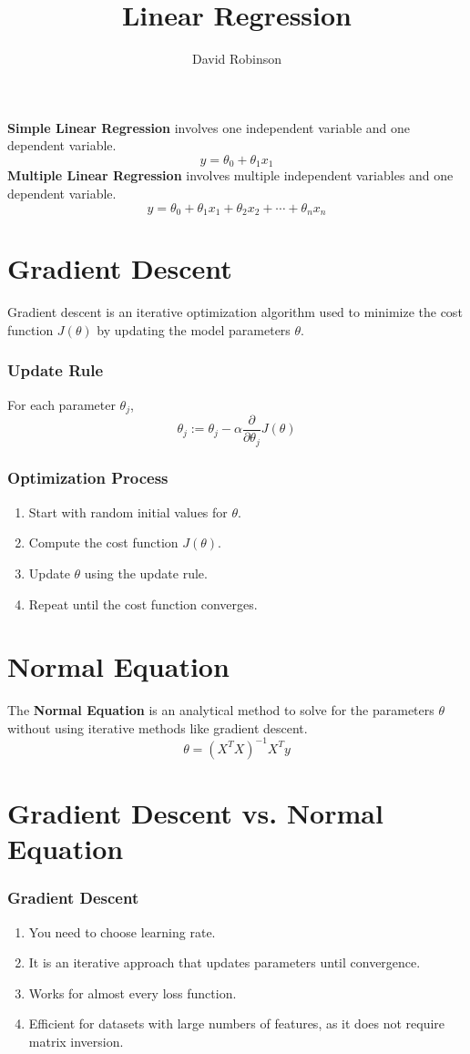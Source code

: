 \documentclass{article}
\title{Linear Regression}
\author{David Robinson}
\date{}
\begin{document}
\maketitle

\textbf{Simple Linear Regression} involves one independent variable and one dependent variable.
\[y=\theta_0 + \theta_1x_1\]
\textbf{Multiple Linear Regression} involves multiple independent variables and one dependent variable.
\[y=\theta_0+\theta_1x_1+\theta_2x_2+\cdots +\theta_n x_n\]

\section*{Gradient Descent}
Gradient descent is an iterative optimization algorithm used to minimize the cost function $J(\theta)$ by updating the model parameters $\theta$.

\subsubsection*{Update Rule}
For each parameter $\theta_j$,
\[\theta_j := \theta_j - \alpha\frac{\partial}{\partial\theta_j}J(\theta)\]

\subsubsection*{Optimization Process}
\begin{enumerate}
    \item Start with random initial values for $\theta$.
    \item Compute the cost function $J(\theta)$.
    \item Update $\theta$ using the update rule.
    \item Repeat until the cost function converges.
\end{enumerate}

\section*{Normal Equation}
The \textbf{Normal Equation} is an analytical method to solve for the parameters $\theta$ without using iterative methods like gradient descent.
\[\theta={(X^T X)}^{-1}X^T y\]

\section*{Gradient Descent vs. Normal Equation}
\subsubsection*{Gradient Descent}
\begin{enumerate}
    \item You need to choose learning rate.
    \item It is an iterative approach that updates parameters until convergence.
    \item Works for almost every loss function.
    \item Efficient for datasets with large numbers of features, as it does not require matrix inversion.
\end{enumerate}
\end{document}
